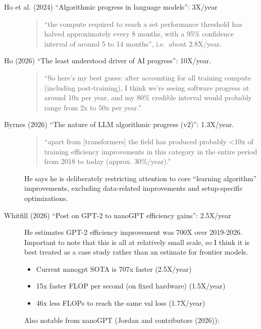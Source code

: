\documentclass[
  11pt,
  letterpaper,
  DIV=11,
  numbers=noendperiod]{scrartcl}
\providecommand{\tightlist}{%
  \setlength{\itemsep}{0pt}\setlength{\parskip}{0pt}}
\begin{document}
\begin{description}
\item[Ho et al. (2024) ``Algorithmic progress in language models'':
3X/year]
\begin{quote}
``the compute required to reach a set performance threshold has halved
approximately every 8 months, with a 95\% confidence interval of around
5 to 14 months'', i.e.~about 2.8X/year.
\end{quote}
\item[Ho (2026) ``The least understood driver of AI progress'':
10X/year.]
\begin{quote}
``So here's my best guess: after accounting for all training compute
(including post-training), I think we're seeing software progress at
around 10x per year, and my 80\% credible interval would probably range
from 2x to 50x per year.''
\end{quote}
\item[Byrnes (2026) ``The nature of LLM algorithmic progress (v2)'':
1.3X/year.]
\begin{quote}
``apart from {[}transformers{]} the field has produced probably
\textless10x of training efficiency improvements in this category in the
entire period from 2018 to today (approx. 30\%/year).''
\end{quote}

He says he is deliberately restricting attention to core ``learning
algorithm'' improvements, excluding data-related improvements and
setup-specific optimizations.
\item[Whitfill (2026) ``Post on GPT-2 to nanoGPT efficiency gains'':
2.5X/year]
He estimates GPT-2 efficiency improvement was 700X over 2019-2026.
Important to note that this is all at relatively small scale, so I think
it is best treated as a case study rather than an estimate for frontier
models.

\begin{itemize}
\tightlist
\item
  Current nanogpt SOTA is 707x faster (2.5X/year)
\item
  15x faster FLOP per second (on fixed hardware) (1.5X/year)
\item
  46x less FLOPs to reach the same val loss (1.7X/year)
\end{itemize}

Also notable from nanoGPT (Jordan and contributors (2026)):


\end{description}
\end{document}
